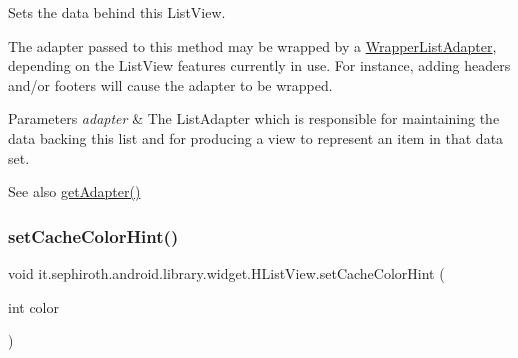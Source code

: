 Sets the data behind this List\+View.

The adapter passed to this method may be wrapped by a \hyperlink{}{Wrapper\+List\+Adapter}, depending on the List\+View features currently in use. For instance, adding headers and/or footers will cause the adapter to be wrapped.


\begin{DoxyParams}{Parameters}
{\em adapter} & The List\+Adapter which is responsible for maintaining the data backing this list and for producing a view to represent an item in that data set.\\
\hline
\end{DoxyParams}
\begin{DoxySeeAlso}{See also}
\hyperlink{classit_1_1sephiroth_1_1android_1_1library_1_1widget_1_1_h_list_view_a70eebe0913d5f7b099e0cf880777b25d}{get\+Adapter()} 
\end{DoxySeeAlso}
\mbox{\label{classit_1_1sephiroth_1_1android_1_1library_1_1widget_1_1_h_list_view_acc497071c313f5c7a6a661d3ffe1da42}} 
\subsubsection{\texorpdfstring{set\+Cache\+Color\+Hint()}{setCacheColorHint()}}
{\footnotesize\ttfamily void it.\+sephiroth.\+android.\+library.\+widget.\+H\+List\+View.\+set\+Cache\+Color\+Hint (\begin{DoxyParamCaption}\item[{int}]{color }\end{DoxyParamCaption})}

\mbox{\label{classit_1_1sephiroth_1_1android_1_1library_1_1widget_1_1_h_list_view_a2a289047ef4485a4bed758c2bc3d0859}} 
